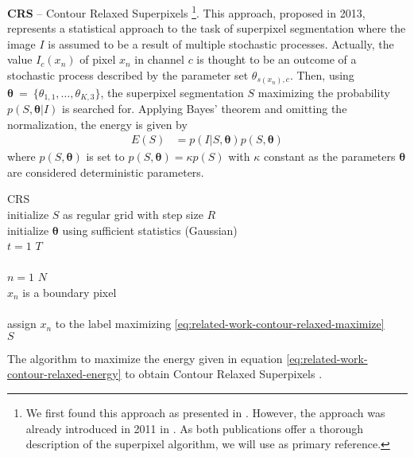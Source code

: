 \textbf{CRS} -- Contour Relaxed Superpixels \cite{MesterConradGuevara:2011,ConradMertzMester:2013}\footnote{We first found this approach as presented in \cite{ConradMertzMester:2013}. However, the approach was already introduced in 2011 in \cite{MesterConradGuevara:2011}. As both publications offer a thorough description of the superpixel algorithm, we will use \cite{ConradMertzMester:2013} as primary reference.}. This approach, proposed in 2013, represents a statistical approach to the task of superpixel segmentation where the image $I$ is assumed to be a result of multiple stochastic processes. Actually, the value $I_c(x_n)$ of pixel $x_n$ in channel $c$ is thought to be an outcome of a stochastic process described by the parameter set $\theta_{s(x_n),c}$. Then, using $\boldsymbol \theta~=~\{\theta_{1,1}, \ldots, \theta_{K,3}\}$, the superpixel segmentation $S$ maximizing  the probability $p(S,\boldsymbol \theta | I)$ is searched for. Applying Bayes' theorem and omitting the normalization, the energy is given by
\begin{align}
	\label{eq:related-work-contour-relaxed-energy}
	E(S) &= p(I | S,\boldsymbol \theta) p(S, \boldsymbol \theta)%
\end{align}
where $p(S, \boldsymbol \theta)$ is set to $ p(S, \boldsymbol \theta) = \kappa p(S)$ with $\kappa$ constant as the parameters $\boldsymbol \theta$ are considered deterministic parameters.
\begin{algorithm}[t]
	\begin{algo}{CRS}{\label{algo:related-work-contour-relaxed}}
		\\
		initialize $S$ as regular grid with step size $R$\\
		initialize $\boldsymbol \theta$ using sufficient statistics (\eg Gaussian)\\
		\qfor $t = 1$ \qto $T$\\
			\\
			\qfor $n = 1$ \qto $N$\\
			\qif $x_n$ is a boundary pixel\\
				\\
				\qthen assign $x_n$ to the label maximizing \eqref{eq:related-work-contour-relaxed-maximize}\qfi\qrof\qrof\\
		\qreturn $S$
	\end{algo}
	\caption{The algorithm to maximize the energy given in equation \eqref{eq:related-work-contour-relaxed-energy} to obtain Contour Relaxed Superpixels \cite{ConradMertzMester:2013}.}
	\label{fig:related-work-contour-relaxed-algorithm}
\end{algorithm}
